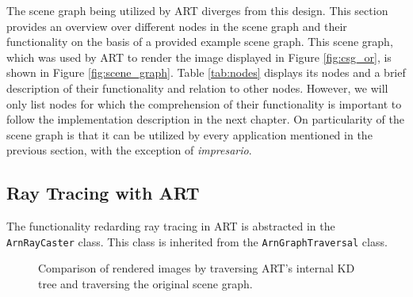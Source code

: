 The scene graph being utilized by ART diverges from this design. This section provides an overview over different nodes in the scene graph and their functionality on the basis of a provided example scene graph. This scene graph, which was used by ART to render the image displayed in Figure \ref{fig:csg_or}, is shown in Figure \ref{fig:scene_graph}. Table \ref{tab:nodes} displays its nodes and a brief description of their functionality and relation to other nodes. However, we will only list nodes for which the comprehension of their functionality is important to follow the implementation description in the next chapter.
On particularity of the scene graph is that it can be utilized by every application mentioned in the previous section, with the exception of \emph{impresario}.

\subsection{Ray Tracing with ART}
\label{sec:art_raytracing}
The functionality redarding ray tracing in ART is abstracted in the \texttt{ArnRayCaster} class. This class is inherited from the \texttt{ArnGraphTraversal} class. 



\begin{figure}[!tbp]
	\centering
	\hfill
	\caption{Comparison of rendered images by traversing ART's internal KD tree and traversing the original scene graph.}
	\label{fig:org_scenegraph}
\end{figure}

